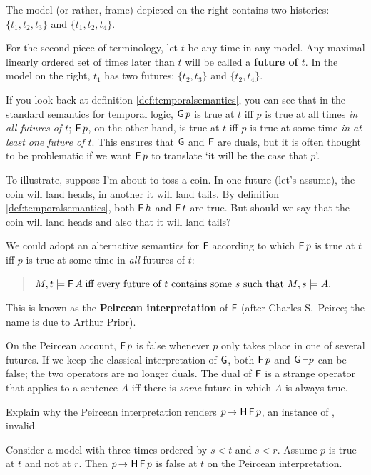 \noindent
The model (or rather, frame) depicted on the right contains two
histories: $\{ t_1, t_2, t_3 \}$ and $\{ t_1, t_2, t_4 \}$.

For the second piece of terminology, let $t$ be any time in any model. Any
maximal linearly ordered set of times later than $t$ will be called a
\textbf{future of $t$}. In the model on the right, $t_1$ has two futures:
$\{ t_2, t_3 \}$ and $\{ t_2, t_4 \}$.

If you look back at definition \ref{def:temporalsemantics}, you can see that in
the standard semantics for temporal logic, $\operatorname{\mathsf{G}} p$ is true at $t$ iff $p$ is
true at all times \emph{in all futures of $t$}; $\operatorname{\mathsf{F}} p$, on the other hand, is
true at $t$ iff $p$ is true at some time \emph{in at least one future of $t$}.
This ensures that $\operatorname{\mathsf{G}}$ and $\operatorname{\mathsf{F}}$ are duals, but it is often thought to be
problematic if we want $\operatorname{\mathsf{F}} p$ to translate `it will be the case that $p$'.

To illustrate, suppose I'm about to toss a coin. In one future (let's assume),
the coin will land heads, in another it will land tails. By definition
\ref{def:temporalsemantics}, both $\operatorname{\mathsf{F}} h$ and $\operatorname{\mathsf{F}} t$ are true. But should we
say that the coin will land heads and also that it will land tails?


We could adopt an alternative semantics for $\operatorname{\mathsf{F}}$ according to which $\operatorname{\mathsf{F}} p$
is true at $t$ iff $p$ is true at some time in \emph{all} futures of $t$:
%
\begin{quote}
  $M,t \models \tF A \;\text{iff every future of $t$ contains some $s$ such that $M,s \models A$}.$
\end{quote}
This is known as the \textbf{Peircean interpretation} of $\operatorname{\mathsf{F}}$ (after
Charles S.\ Peirce; the name is due to Arthur Prior).

On the Peircean account, $\operatorname{\mathsf{F}} p$ is false whenever $p$ only takes place in one
of several futures. If we keep the classical interpretation of $\operatorname{\mathsf{G}}$, both
$\operatorname{\mathsf{F}} p$ and $\operatorname{\mathsf{G}} \neg p$ can be false; the two operators are no longer duals.
The dual of $\operatorname{\mathsf{F}}$ is a strange operator that applies to a sentence $A$ iff there
is \emph{some} future in which $A$ is always true.

\begin{exercise}
  Explain why the Peircean interpretation renders $p \to \tH\tF p$, an instance
  of , invalid.
\end{exercise}
\begin{solution}
  Consider a model with three times ordered by $s<t$ and $s<r$. Assume $p$ is true at $t$ and not at $r$. Then $p \to \tH\tF p$ is false at $t$ on the Peircean interpretation.
\end{solution}

